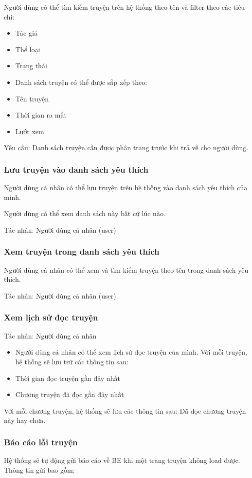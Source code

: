 \documentclass[./../main.tex]{subfiles}
\begin{document}
Người dùng có thể tìm kiếm truyện trên hệ thống theo tên và filter theo các tiêu chí:
\begin{itemize}
\item Tác giả
\item Thể loại
\item Trạng thái
\item Danh sách truyện có thể được sắp xếp theo:
\item Tên truyện
\item Thời gian ra mắt
\item Lướt xem
\end{itemize}
Yêu cầu: Danh sách truyện cần được phân trang trước khi trả về cho người dùng.
\subsubsection{Lưu truyện vào danh sách yêu thích}
Người dùng cá nhân có thể lưu truyện trên hệ thống vào danh sách yêu thích của mình.

Người dùng có thể xem danh sách này bất cứ lúc nào.


Tác nhân: Người dùng cá nhân (user)
\subsubsection{Xem truyện trong danh sách yêu thích}
Người dùng cá nhân có thể xem và tìm kiếm truyện theo tên trong danh sách yêu thích.

Tác nhân: Người dùng cá nhân (user)
\subsubsection{Xem lịch sử đọc truyện}
Tác nhân: Người dùng cá nhân
\begin{itemize}
\item Người dùng cá nhân có thể xem lịch sử đọc truyện của mình. Với mỗi truyện, hệ thống sẽ lưu trữ các thông tin sau:
\item Thời gian đọc truyện gần đây nhất
\item Chương truyện đã đọc gần đây nhất
\end{itemize}
Với mỗi chương truyện, hệ thống sẽ lưu các thông tin sau: Đã đọc chương truyện này hay chưa.
\subsubsection{Báo cáo lỗi truyện}
Hệ thống sẽ tự động gửi báo cáo về BE khi một trang truyện không load được. Thông tin gửi bao gồm:
\end{document}

